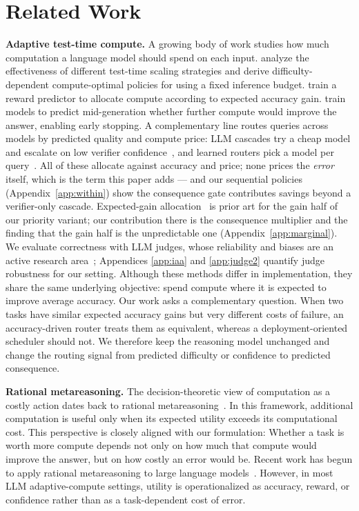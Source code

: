 \documentclass{article}
\begin{document}
\section{Related Work}

\textbf{Adaptive test-time compute.}
A growing body of work studies how much computation a language model
should spend on each input. \citet{snell2024scaling} analyze the effectiveness of different test-time scaling strategies and derive difficulty-dependent compute-optimal policies for using a fixed inference budget. \citet{damani2024learning}
train a reward predictor to allocate compute according to expected
accuracy gain. \citet{manvi2024adaptive} train models to predict mid-generation
whether further compute would improve the answer, enabling early
stopping. A complementary line routes queries across models by
predicted quality and compute price: LLM cascades try a cheap model
and escalate on low verifier confidence~\citep{chen2023frugalgpt,
aggarwal2024automix}, and learned routers pick a model per
query~\citep{ong2024routellm, ding2024hybrid}. All of these
allocate against accuracy and price; none prices the \emph{error}
itself, which is the term this paper adds --- and our sequential
policies (Appendix~\ref{app:within}) show the consequence gate
contributes savings beyond a verifier-only cascade. Expected-gain
allocation~\citep{damani2024learning} is prior art for the
gain half of our priority variant; our contribution there is the
consequence multiplier and the finding that the gain half is the
unpredictable one (Appendix~\ref{app:marginal}). We evaluate
correctness with LLM judges, whose reliability and biases are an
active research area~\citep{zheng2023judging}; Appendices
\ref{app:iaa} and \ref{app:judge2} quantify judge robustness for
our setting. Although
these methods differ in implementation, they share the same underlying
objective: spend compute where it is expected to improve average
accuracy. Our work asks a complementary question. When two tasks have
similar expected accuracy gains but very different costs of failure,
an accuracy-driven router treats them as equivalent, whereas a
deployment-oriented scheduler should not. We therefore keep the
reasoning model unchanged and change the routing signal from predicted
difficulty or confidence to predicted consequence.

\textbf{Rational metareasoning.}
The decision-theoretic view of computation as a costly action dates
back to rational metareasoning~\citep{russell1991right,
hay2012selecting}. In this framework, additional computation is useful
only when its expected utility exceeds its computational cost.
This perspective is closely aligned with our formulation: Whether a task is worth more compute depends not only on how much that compute would improve the answer, but on how costly an error would be. Recent work
has begun to apply rational metareasoning to large language
models~\citep{yang2024rational}. However, in most LLM adaptive-compute
settings, utility is operationalized as accuracy, reward, or confidence
rather than as a task-dependent cost of error.
\end{document}
